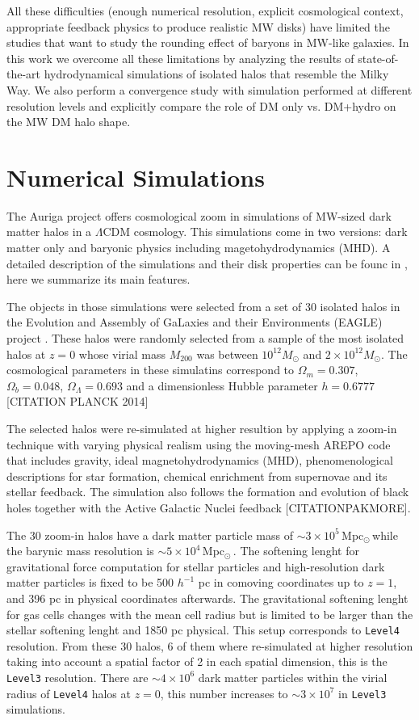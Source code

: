 \documentclass[a4paper,fleqn,usenatbib]{mnras}
\newcommand{\Msun}{\,{\rm Mpc}$_{\odot}$\,}
\begin{document}
All these difficulties (enough numerical resolution, explicit
cosmological context, appropriate feedback physics to produce
realistic MW disks) have limited the studies that want to study the
rounding effect of baryons in MW-like galaxies.
In this work we overcome all these limitations by analyzing the
results of state-of-the-art hydrodynamical simulations of isolated
halos that resemble the Milky Way.
We also perform a convergence study with simulation performed at
different resolution levels and explicitly compare the role of DM only
vs. DM+hydro on the MW DM halo shape.


\section{Numerical Simulations}


The Auriga project offers cosmological zoom in simulations of MW-sized 
dark matter halos in a $\Lambda$CDM cosmology. 
This simulations come in two versions: dark matter only and
baryonic physics including magetohydrodynamics (MHD).
A detailed description of the simulations and their
disk properties can be founc in \citep{auriga}, here we summarize its
main features.

The objects in those simulations were selected from a set of 30
isolated halos in the Evolution and Assembly of GaLaxies and their
Environments (EAGLE)  project \citep{Eagle}.   
These halos were randomly selected from a sample of the most isolated
halos at $z=0$ whose virial mass $M_{200}$ was between $10^{12}M_\odot$ and
$2\times 10^{12}M_\odot$. 
The cosmological parameters in these simulatins correspond to
$\Omega_m=0.307$, $\Omega_b=0.048$, $\Omega_\Lambda=0.693$ and a
dimensionless Hubble parameter $h=0.6777$ [CITATION PLANCK 2014]


The selected halos were re-simulated at higher resultion by applying a
zoom-in technique with varying physical realism using the moving-mesh AREPO code
that includes gravity, ideal magnetohydrodynamics (MHD), 
phenomenological descriptions for star formation, chemical enrichment
from supernovae and its stellar feedback.  The simulation also follows
the formation and evolution of black holes together with the Active
Galactic Nuclei feedback \citep{arepo} [CITATIONPAKMORE].  


The 30 zoom-in halos have a dark matter particle mass of $\sim 3\times
10^5$\Msun while the barynic mass resolution is $\sim 5\times 10^4$\Msun.
The softening lenght for gravitational force computation for stellar
particles and high-resolution dark matter particles 
is fixed to be 500 $h^{-1}$ pc in comoving coordinates up to $z=1$,
and 396 pc in physical coordinates afterwards.
The gravitational softening lenght for gas cells changes with the mean
cell radius but is limited to be larger than the stellar softening
lenght and 1850 pc physical. 
This setup corresponds to \texttt{Level4} resolution.
From these 30 halos, 6 of them where re-simulated at higher resolution
taking into account a spatial factor of 2 in each spatial dimension,
this is the \texttt{Level3} resolution.  
There are $\sim 4\times 10^6$ dark matter particles within the virial radius
of \texttt{Level4} halos at $z=0$, this number increases to $\sim 3\times 10^7$ in
\texttt{Level3} simulations. 
 
\end{document}
